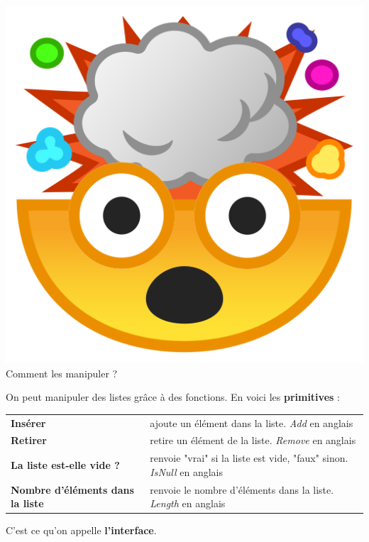 \includegraphics[scale=0.03]{Thème 1 – Structures de données/Chapitre 1 - Interface et implémentation/BLOB/mindblow}{\selectfont
Comment les manipuler ?\\
}

On peut manipuler des listes grâce à des fonctions. En voici les \textbf{primitives} :\\

\noindent\begin{tabular}{l | l }
    \textbf{Insérer} & ajoute un élément dans la liste. \textit{Add} en anglais\\
    \textbf{Retirer} & retire un élément de la liste.   \textit{Remove} en anglais \\
    \textbf{La liste est-elle vide ?} & renvoie "vrai" si la liste est vide, "faux" sinon.   \textit{IsNull} en anglais\\
    \textbf{Nombre d'éléments dans la liste} & renvoie le nombre d'éléments dans la liste. \textit{Length} en anglais\\[0.5cm]
\end{tabular}

C'est ce qu'on appelle \textbf{l'interface}.\\

